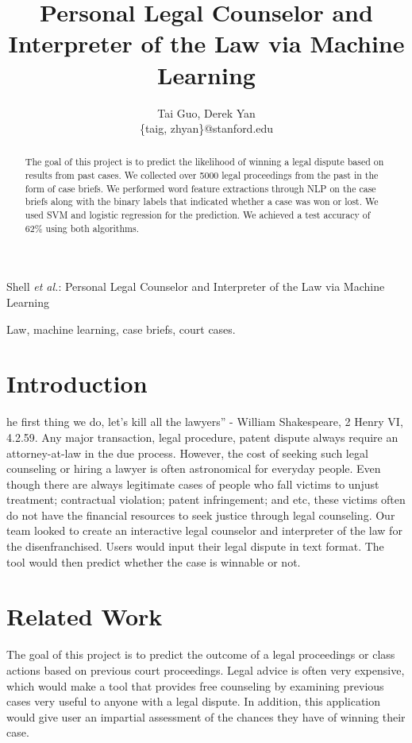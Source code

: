 \documentclass[journal]{IEEEtran}
\begin{document}
\title{Personal Legal Counselor and Interpreter of the Law via Machine Learning}
\author{Tai Guo, Derek Yan\\
\{taig, zhyan\}@stanford.edu}
{Shell \MakeLowercase{\textit{et al.}}: Personal Legal Counselor and Interpreter of the Law via Machine Learning}
\maketitle

\begin{abstract}
The goal of this project is to predict the likelihood of winning a legal dispute based on results from past cases. We collected over 5000 legal proceedings from the past in the form of case briefs. We performed word feature extractions through NLP on the case briefs along with the binary labels that indicated whether a case was won or lost. We used SVM and logistic regression for the prediction. We achieved a test accuracy of 62\% using both algorithms.
\end{abstract}

\begin{keywords}
Law, machine learning, case briefs, court cases.
\end{keywords}

\section{Introduction}
 he first thing we do, let’s kill all the lawyers'' - William Shakespeare, 2 Henry VI, 4.2.59. Any major transaction, legal procedure, patent dispute always require an attorney-at-law in the due process. However, the cost of seeking such legal counseling or hiring a lawyer is often astronomical for everyday people. Even though there are always legitimate cases of people who fall victims to unjust treatment; contractual violation; patent infringement; and etc, these victims often do not have the financial resources to seek justice through legal counseling. Our team looked to create an interactive legal counselor and interpreter of the law for the disenfranchised. Users would input their legal dispute in text format. The tool would then predict whether the case is winnable or not.

\section{Related Work}
The goal of this project is to predict the outcome of a legal proceedings or class actions based on previous court proceedings. Legal advice is often very expensive, which would make a tool that provides free counseling by examining previous cases very useful to anyone with a legal dispute. In addition, this application would give user an impartial assessment of the chances they have of winning their case.
\end{document}
